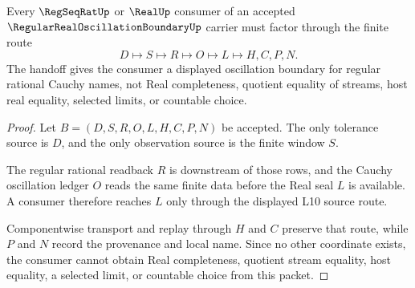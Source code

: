 \begin{theorem}
\label{thm:regular-real-oscillation-boundary-l10-handoff}
Every $\RegSeqRatUp$ or $\RealUp$ consumer of an accepted $\RegularRealOscillationBoundaryUp$ carrier must factor through the finite route
$$
D \longmapsto S \longmapsto R \longmapsto O \longmapsto L \longmapsto H,C,P,N .
$$
The handoff gives the consumer a displayed oscillation boundary for regular rational Cauchy names, not Real completeness, quotient equality of streams, host real equality, selected limits, or countable choice.
\end{theorem}
\begin{proof}
Let $B=(D,S,R,O,L,H,C,P,N)$ be accepted. The only tolerance source is $D$, and the only observation source is the finite window $S$.

The regular rational readback $R$ is downstream of those rows, and the Cauchy oscillation ledger $O$ reads the same finite data before the Real seal $L$ is available. A consumer therefore reaches $L$ only through the displayed L10 source route.

Componentwise transport and replay through $H$ and $C$ preserve that route, while $P$ and $N$ record the provenance and local name. Since no other coordinate exists, the consumer cannot obtain Real completeness, quotient stream equality, host equality, a selected limit, or countable choice from this packet.
\end{proof}




